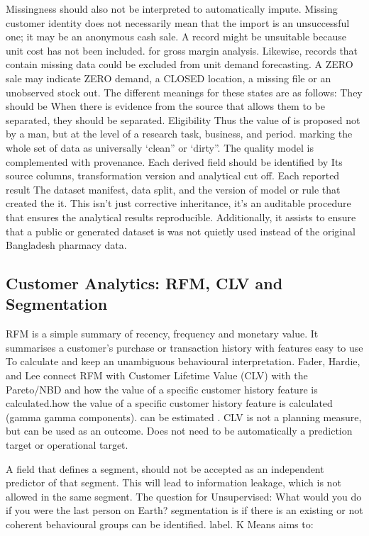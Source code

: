 \documentclass[a4paper,11pt,oneside]{book}
\theoremstyle{plain}
\theoremstyle{definition}
\theoremstyle{remark}
\begin{document}
Missingness should also not be interpreted to automatically impute. Missing customer identity does not necessarily mean that the import is an unsuccessful one; it may be an anonymous cash sale. A record might be unsuitable because unit cost has not been included. for gross margin analysis. Likewise, records that contain missing data could be excluded from unit demand forecasting. A ZERO sale may indicate ZERO demand, a CLOSED location, a missing file or an unobserved stock out. The different meanings for these states are as follows: They should be When there is evidence from the source that allows them to be separated, they should be separated. Eligibility Thus the value of is proposed not by a man, but at the level of a research task, business, and period. marking the whole set of data as universally ‘clean” or ‘dirty”. The quality model is complemented with provenance. Each derived field should be identified by Its source columns, transformation version and analytical cut off. Each reported result The dataset manifest, data split, and the version of model or rule that created the it. This isn't just corrective inheritance, it's an auditable procedure that ensures the analytical results reproducible. Additionally, it assists to ensure that a public or generated dataset is was not quietly used instead of the original Bangladesh pharmacy data.

\subsection{Customer Analytics: RFM, CLV and Segmentation}

RFM is a simple summary of recency, frequency and monetary value. It summarises a customer's purchase or transaction history with features easy to use To calculate and keep an unambiguous behavioural interpretation. Fader, Hardie, and Lee connect RFM with Customer Lifetime Value (CLV) with the Pareto/NBD and how the value of a specific customer history feature is calculated.how the value of a specific customer history feature is calculated (gamma gamma components). can be estimated \cite{fader2005rfm}. CLV is not a planning measure, but can be used as an outcome. Does not need to be automatically a prediction target or operational target.

A field that defines a segment, should not be accepted as an independent predictor of that segment. This will lead to information leakage, which is not allowed in the same segment. The question for Unsupervised: What would you do if you were the last person on Earth? segmentation is if there is an existing or not coherent behavioural groups can be identified. label. K Means aims to:
\end{document}
